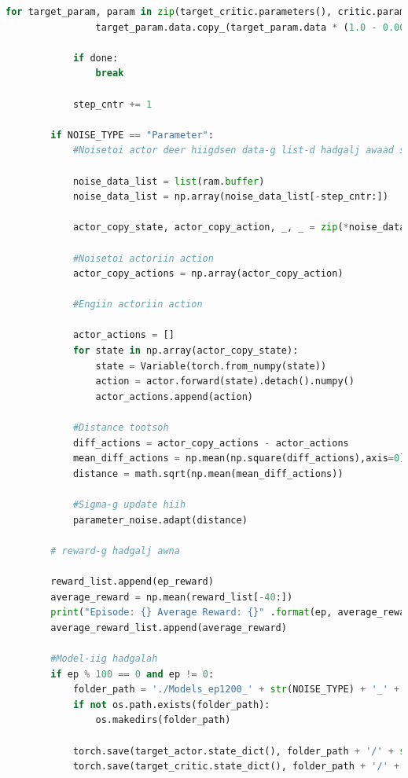 \documentclass[12pt,A4]{report}
\begin{document}
\begin{lstlisting}[language=Python, caption=main.py, frame=single]
            for target_param, param in zip(target_critic.parameters(), critic.parameters()):
                target_param.data.copy_(target_param.data * (1.0 - 0.001) + param.data * 0.001)
            
            if done:
                break

            step_cntr += 1

        if NOISE_TYPE == "Parameter":
            #Noisetoi actor deer hiigdsen data-g list-d hadgalj awaad suuliin episode-d hiigdsen stepiin toogoor datagaa awna
            
            noise_data_list = list(ram.buffer)
            noise_data_list = np.array(noise_data_list[-step_cntr:])

            actor_copy_state, actor_copy_action, _, _ = zip(*noise_data_list)

            #Noisetoi actoriin action
            actor_copy_actions = np.array(actor_copy_action)

            #Engiin actoriin action

            actor_actions = []
            for state in np.array(actor_copy_state):
                state = Variable(torch.from_numpy(state))
                action = actor.forward(state).detach().numpy()
                actor_actions.append(action)

            #Distance tootsoh
            diff_actions = actor_copy_actions - actor_actions
            mean_diff_actions = np.mean(np.square(diff_actions),axis=0)
            distance = math.sqrt(np.mean(mean_diff_actions))

            #Sigma-g update hiih
            parameter_noise.adapt(distance)

        # reward-g hadgalj awna

        reward_list.append(ep_reward)
        average_reward = np.mean(reward_list[-40:])
        print("Episode: {} Average Reward: {}" .format(ep, average_reward))
        average_reward_list.append(average_reward)

        #Model-iig hadgalah
        if ep % 100 == 0 and ep != 0:
            folder_path = './Models_ep1200_' + str(NOISE_TYPE) + '_' + str(ACTOR_LEARNING_RATE) + '_' + str(CRITIC_LEARNING_RATE)
            if not os.path.exists(folder_path):
                os.makedirs(folder_path)
            
            torch.save(target_actor.state_dict(), folder_path + '/' + str(ep) + '_actor.pt')
            torch.save(target_critic.state_dict(), folder_path + '/' + str(ep) + '_critic.pt')


\end{lstlisting}
\end{document}
